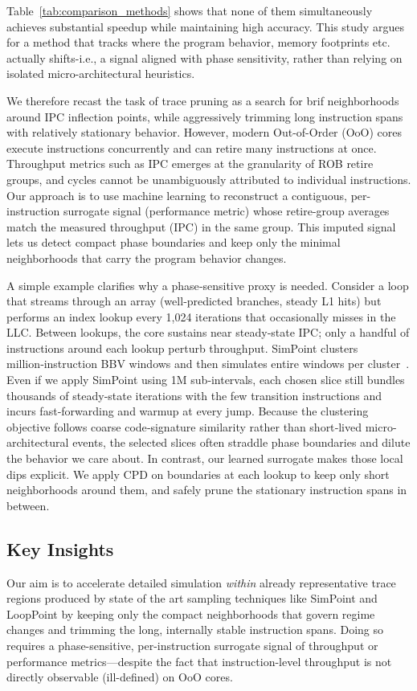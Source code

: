 Table~\ref{tab:comparison_methods} shows that none of them simultaneously achieves substantial speedup while maintaining high accuracy. This study argues for a method that tracks where the program behavior, memory footprints etc. actually shifts-i.e., a signal aligned with phase sensitivity, rather than relying on isolated micro-architectural heuristics.


We therefore recast the task of trace pruning as a search for brif neighborhoods around IPC inflection points, while aggressively trimming long instruction spans with relatively stationary behavior. However, modern Out-of-Order (OoO) cores execute instructions concurrently and can retire many instructions at once. Throughput metrics such as IPC emerges at the granularity of ROB retire groups, and cycles cannot be unambiguously attributed to individual instructions. Our approach is to use machine learning to reconstruct a contiguous, per-instruction surrogate signal (performance metric) whose retire-group averages match the measured throughput (IPC) in the same group. This imputed signal lets us detect compact phase boundaries and keep only the minimal neighborhoods that carry the program behavior changes. 

A simple example clarifies why a phase‑sensitive proxy is needed. Consider a loop that streams through an array (well‑predicted branches, steady L1 hits) but performs an index lookup every 1,024 iterations that occasionally misses in the LLC. Between lookups, the core sustains near steady‑state IPC; only a handful of instructions around each lookup perturb throughput. SimPoint clusters million‑instruction BBV windows and then simulates entire windows per cluster~\cite{simpoint-asplos02,simpoint03,simpoint-howto}. Even if we apply SimPoint using 1M sub‑intervals, each chosen slice still bundles thousands of steady‑state iterations with the few transition instructions and incurs fast‑forwarding and warmup at every jump. Because the clustering objective follows coarse code‑signature similarity rather than short‑lived micro-architectural events, the selected slices often straddle phase boundaries and dilute the behavior we care about. In contrast, our learned surrogate makes those local dips explicit. We apply CPD on \pts boundaries at each lookup to keep only short neighborhoods around them, and safely prune the stationary instruction spans in between.

\subsection*{Key Insights}
\label{sec:intuition}
Our aim is to accelerate detailed simulation \emph{within} already representative trace regions produced by state of the art sampling techniques like SimPoint and LoopPoint by keeping only the compact neighborhoods that govern regime changes and trimming the long, internally stable instruction spans. Doing so requires a phase-sensitive, per-instruction surrogate signal of throughput or performance metrics—despite the fact that instruction-level throughput is not directly observable (ill-defined) on OoO cores.

